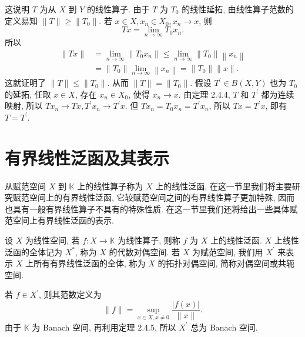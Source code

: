 \documentclass[openany]{ctexbook}
\makeatletter
\theoremstyle{kaiti}
\theoremstyle{normal}
\renewenvironment{proof}[1][\proofname]{\par
    \pushQED{\qed}%
    \normalfont \topsep6\p@\@plus6\p@\relax
    \trivlist
    \item\relax
    {\heiti #1}\hspace{2\labelsep}\ignorespaces
  }{%
    \popQED\endtrivlist\@endpefalse
  }
\makeatother
\begin{document}
\begin{proof}
$$$$
这说明 $T$ 为从 $X$ 到 $Y$ 的线性算子. 由于 $T$ 为 $T_0$ 的线性延拓, 由线性算子范数的定义易知 $\|T\| \geqslant\left\|T_0\right\|$. 若 $x \in X, x_n \in X_0, x_n \rightarrow x$, 则
$$
T x=\lim_{n \rightarrow \infty} T_0 x_n.
$$
所以
$$
\begin{aligned}
\|T x\| &=\lim_{n \rightarrow \infty}\left\|T_0 x_n\right\| \leqslant \lim_{n \rightarrow \infty}\left\|T_0\right\|\left\|x_n\right\| \\
&=\left\|T_0\right\| \lim_{n \rightarrow \infty}\left\|x_n\right\|=\left\|T_0\right\|\|x\|.
\end{aligned}
$$
这就证明了 $\|T\| \leqslant\left\|T_0\right\|$. 从而 $\|T\|=\left\|T_0\right\|$.
假设 $T^{\prime} \in B(X, Y)$ 也为 $T_0$ 的延拓, 任取 $x \in X$, 存在 $x_n \in X_0$, 使得 $x_n \rightarrow x$. 由定理 2.4.4, $T$ 和 $T^{\prime}$ 都为连续映射, 所以 $T x_n \rightarrow T x, T^{\prime} x_n \rightarrow T^{\prime} x$. 但 $T x_n=T_0 x_n=T^{\prime} x_n$, 所以 $T x=T^{\prime} x$, 即有 $T=T^{\prime}$.
\end{proof}

\section{有界线性泛函及其表示}

从赋范空间 $X$ 到 $\mathbb{K}$ 上的线性算子称为 $X$ 上的线性泛函, 在这一节里我们将主要研究赋范空间上的有界线性泛函, 它较赋范空间之间的有界线性算子更加特殊, 因而也具有一般有界线性算子不具有的特殊性质. 在这一节里我们还将给出一些具体赋范空间上有界线性泛函的表示.

设 $X$ 为线性空间, 若 $f: X \rightarrow \mathbb{K}$ 为线性算子, 则称 $f$ 为 $X$ 上的线性泛函. $X$ 上线性泛函的全体记为 $X^{*}$, 称为 $X$ 的代数对偶空间. 若 $X$ 为赋范空间, 我们用 $X^{\prime}$ 来表示 $X$ 上所有有界线性泛函的全体, 称为 $X$ 的拓扑对偶空间, 简称对偶空间或共轭空间.

若 $f \in X^{\prime}$, 则其范数定义为
$$
\|f\|=\sup_{x \in X, x \neq 0} \frac{|f(x)|}{\|x\|}.
$$
由于 $\mathbb{K}$ 为 Banach 空间, 再利用定理 2.4.5, 所以 $X^{\prime}$ 总为 Banach 空间.
\end{document}
